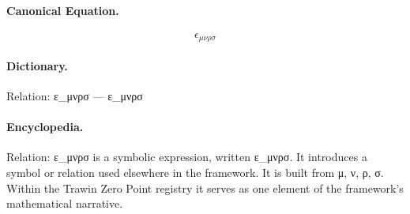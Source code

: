 \paragraph{Canonical Equation.}
\[
\epsilon_{\mu\nu\rho\sigma}
\]

\paragraph{Dictionary.}
Relation: ε\_μνρσ — ε\_μνρσ

\paragraph{Encyclopedia.}
Relation: ε\_μνρσ is a symbolic expression, written ε\_μνρσ. It introduces a symbol or relation used elsewhere in the framework. It is built from μ, ν, ρ, σ. Within the Trawin Zero Point registry it serves as one element of the framework's mathematical narrative.
